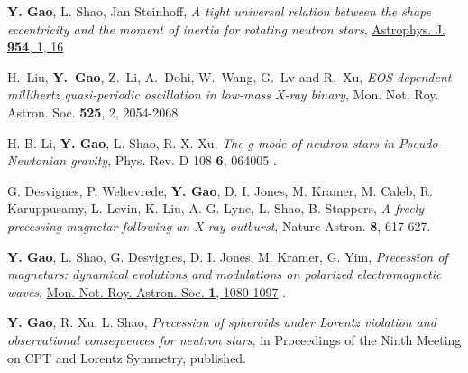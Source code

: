 \begin{etaremune}
  {\bf Y. Gao},
  L. Shao,
  Jan Steinhoff,
  {\it A tight universal relation between the shape eccentricity and the moment of inertia for rotating neutron stars},
  \href{https://iopscience.iop.org/article/10.3847/1538-4357/ace776}{Astrophys. J. {\bf 954}, {1}, 16}
  \item 
  H.~Liu, {\bf Y.~Gao}, Z.~Li, A.~Dohi, W.~Wang, G.~Lv and R.~Xu,
  {\it EOS-dependent millihertz quasi-periodic oscillation in low-mass X-ray binary},
  Mon. Not. Roy. Astron. Soc. {\bf 525}, 2, 2054-2068
  \item
  H.-B. Li, 
  {\bf Y. Gao}, 
  L. Shao, 
  R.-X. Xu, 
  {\it The g-mode of neutron stars in Pseudo-Newtonian gravity}, 
  Phys. Rev. D 108 {\bf 6}, 064005
  .
  \item
  G. Desvignes, 
  P. Weltevrede, 
  {\bf Y. Gao}, 
  D. I. Jones, 
  M. Kramer, 
  M. Caleb, 
  R. Karuppusamy, 
  L. Levin, 
  K. Liu, 
  A. G. Lyne, 
  L. Shao, 
  B. Stappers, 
  {\it A freely precessing magnetar following an X-ray outburst}, 
  Nature Astron. {\bf 8}, 617-627.
  \item  
  {\bf Y. Gao},
  L. Shao,
  G. Desvignes,
  D. I. Jones,
  M. Kramer,
  G. Yim,
  {\it Precession of magnetars: dynamical evolutions and modulations on polarized electromagnetic waves}, \href{https://doi.org/10.1093/mnras/stac3546}{Mon. Not. Roy. Astron. Soc. {\bf 1}, 1080-1097}
  .
  \item 
  {\bf Y. Gao}, 
  R. Xu, 
  L. Shao, 
  {\it Precession of spheroids under Lorentz violation and observational consequences for neutron stars}, 
  in Proceedings of the Ninth Meeting on CPT and Lorentz Symmetry, published.


\end{etaremune}
